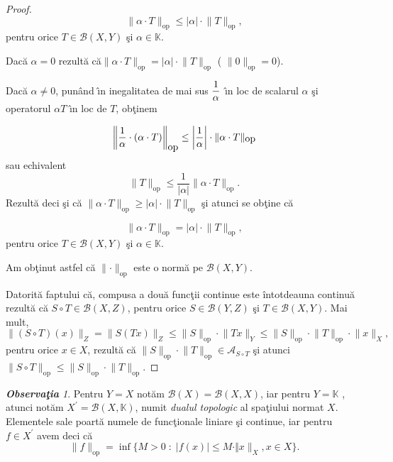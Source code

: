 \documentclass[ a4paper, 12pt]{report}
\theoremstyle{definition}
\theoremstyle{remark}
\newtheorem{obs}{\bf Observa\c tia }[section]
\numberwithin{equation}{section}
\begin{document}
\begin{proof}
$$\lVert \alpha \cdot T  \rVert_{\mbox{op}} \leq \lvert \alpha \rvert \cdot \lVert T \rVert_{\mbox{op}},$$ pentru orice $T \in \mathcal{B}(X,Y)$ \c si $\alpha \in \mathbb{K}$.

Dac\u a $\alpha = 0$ rezult\u a c\u a$\lVert  \alpha \cdot T \rVert_{\mbox{op}} = \lvert \alpha \rvert \cdot \lVert T \rVert_{\mbox{op}}$ ( $\lVert 0 \rVert_{\mbox{op}} = 0$).

Dac\u a $\alpha \neq 0$, pun\^ and \^\i n inegalitatea de mai sus $\displaystyle\frac{1}{\alpha}$ \^\i n loc de scalarul $\alpha$ \c si operatorul $\alpha T$ \^\i n loc de $T$, ob\c tinem

$$\left\lVert \displaystyle\frac{1}{\alpha} \cdot (\alpha \cdot T) \right\rVert_{\mbox{op}} \leq \left\lvert  \frac{1}{\alpha} \right\rvert \cdot \lVert \alpha \cdot T \rVert_{\mbox{op}}$$ sau echivalent
$$\lVert T \rVert_{\mbox{op}} \leq \frac{1}{\lvert \alpha \rvert} \lVert \alpha \cdot T \rVert_{\mbox{op}}.$$ Rezult\u a deci \c si c\u a
$\lVert \alpha \cdot T \rVert_{\mbox{op}} \geq \lvert \alpha \rvert \cdot \lVert T \rVert_{\mbox{op}}$ \c si atunci se ob\c tine c\u a

$$\lVert\! \alpha\! \cdot\! T \rVert_{\mbox{op}}\! =\! \lvert \alpha \rvert \cdot \lVert T \rVert_{\mbox{op}},$$ pentru orice $T\!\! \in\!\! \mathcal{B}(X,Y)$ \c si  $\alpha \in \mathbb{K}$.


Am ob\c tinut astfel c\u a $\lVert \cdot  \rVert_{\mbox{op}}$ este o norm\u a pe $\mathcal{B}(X,Y)$.

Datorit\u a faptului c\u a, compusa a dou\u a func\c tii continue este \^intotdeauna continu\u a rezult\u a c\u a $S \circ T \in \mathcal{B}(X,Z)$, pentru orice $S \in \mathcal{B}(Y,Z)$ \c si $T \in \mathcal{B}(X,Y)$.
Mai mult,
\[ \lVert (S \circ T)(x) \rVert_{Z} = \lVert S(Tx)  \rVert_{Z} \leq \lVert S \rVert_{\mbox{op}} \cdot \lVert Tx \rVert_{Y} \leq \lVert S \rVert_{\mbox{op}} \cdot \lVert T \rVert_{\mbox{op}} \cdot \lVert x \rVert_{X} ,\] pentru orice $x \in X$, rezult\u a c\u a $\lVert S \rVert_{\mbox{op}} \cdot \lVert T \rVert_{\mbox{op}} \in \mathcal{A}_{S \circ T}$ \c si atunci
 $\lVert S \circ T \rVert_{\mbox{op}} \leq \lVert S \rVert_{\mbox{op}} \cdot \lVert T \rVert_{\mbox{op}}.$

\end{proof}

\begin{obs}
Pentru $Y = X$ not\u am $\mathcal{B}(X) = \mathcal{B}(X,X)$, iar pentru $Y = \mathbb{K}$ , atunci not\u am $X^{'}= \mathcal{B}(X,\mathbb{K})$, numit {\it dualul topologic} al spa\c tiului normat $X$.
Elementele sale poart\u a numele de func\c tionale liniare \c si continue, iar pentru $f \in X^{'}$ avem deci c\u a
$$\lVert f \rVert_{\mbox{op}} = \inf \{ M >0 \; : \; \lvert f(x) \rvert \leq M \cdot \Vert x \rVert_{X},  x \in X\}.$$
 \end{obs}
\end{document}
